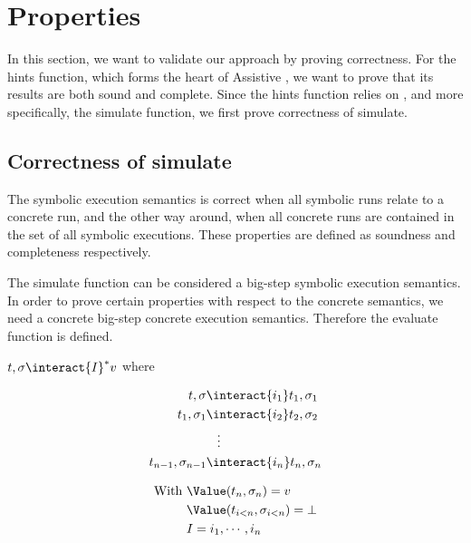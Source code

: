 
\section{Properties}
\label{sec:properties}

In this section, we want to validate our approach by proving correctness.
For the hints function, which forms the heart of Assistive \TOPHAT, we want to prove that its results are both sound and complete.
Since the hints function relies on \STOPHAT, and more specifically, the simulate function,
we first prove correctness of simulate.


\subsection{Correctness of simulate}

The symbolic execution semantics is correct when all symbolic runs relate to a concrete run,
and the other way around, when all concrete runs are contained in the set of all symbolic executions.
These properties are defined as soundness and completeness respectively.

The simulate function can be considered a big-step symbolic execution semantics.
In order to prove certain properties with respect to the concrete semantics,
we need a concrete big-step concrete execution semantics.
Therefore the evaluate function is defined.

\begin{definition}[Evaluate]
  $t,\sigma\interact{I}^* v$ where

  \begin{minipage}[c]{0.4\textwidth}
    \begin{align*}
      t,\sigma             & \interact{i_1}  t_1,\sigma_1\\
      t_1,\sigma_1         & \interact{i_2}  t_2,\sigma_2\\
                           & \hspace{3mm}\vdots    \\
      t_{n-1},\sigma_{n-1} & \interact{i_n}  t_n,\sigma_n
    \end{align*}
\end{minipage}
\begin{minipage}[c]{0.1\textwidth}
  \Quad
\end{minipage}
\begin{minipage}[c]{0.3\textwidth}
  \begin{align*}
  \text{With }&\Value(t_n,\sigma_n)=v\\
  &\Value(t_{i<n},\sigma_{i<n})=\bot\\
  &I=i_1,\cdots,i_n
\end{align*}
\end{minipage}
\label{def:evaluate}
\end{definition}

